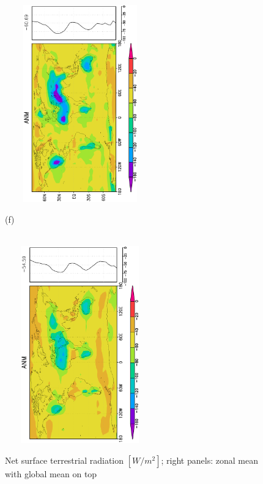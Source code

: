 \documentclass[12pt,a4paper,twoside,openright,headinclude,liststotoc,bibtotoc]{scrreprt}
\begin{document}
\begin{figure}[H]
{\includegraphics[height=8.5cm,width=6.5cm,angle=-90]
{eps/zonaltmsfcthermrad177.eps}
}
\parbox{8.5cm}{\hspace{0.28cm}\begin{scriptsize}(f)\end{scriptsize} \vspace{-0.7cm} \\
\includegraphics[height=8.5cm,width=6.5cm,angle=-90]
{eps/zonalt21tmsfcthermrad.eps}
}
\caption[Net surface terrestrial radiation]{Net surface terrestrial radiation $[W/m^2]$; right panels: zonal mean with global mean on top}
\label{img:sfcthermrad}
\end{figure}
\end{document}
